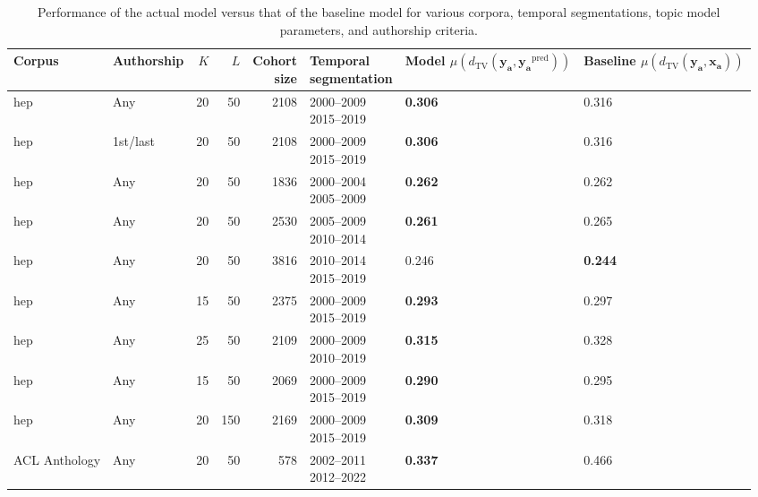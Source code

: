 \begin{table}[H]
\caption{Performance of the actual model versus that of the baseline model for various corpora, temporal segmentations, topic model parameters, and authorship criteria.}
\label{table:performance}
\begin{tabular}{llrrrlll}
\toprule
Corpus & Authorship & $K$ & $L$ & \makecell{Cohort \\ size} & \makecell{Temporal \\ segmentation} & \makecell{Model \\ $\mu(d_{{\mathrm{{TV}}}}(\bm{{y_{{a}}}}, \bm{{y_{{a}}}}^{{\text{{pred}}}}))$} & \makecell{Baseline \\ $\mu(d_{{\mathrm{{TV}}}}(\bm{{y_{{a}}}}, \bm{{x_{{a}}}}))$} \\
\midrule
\gls{hep} & Any & 20 & 50 & 2108 & \makecell{2000--2009 \\ 2015--2019} & \textbf{0.306} & 0.316 \\
\gls{hep} & 1st/last & 20 & 50 & 2108 & \makecell{2000--2009 \\ 2015--2019} & \textbf{0.306} & 0.316 \\
\gls{hep} & Any & 20 & 50 & 1836 & \makecell{2000--2004 \\ 2005--2009} & \textbf{0.262} & 0.262 \\
\gls{hep} & Any & 20 & 50 & 2530 & \makecell{2005--2009 \\ 2010--2014} & \textbf{0.261} & 0.265 \\
\gls{hep} & Any & 20 & 50 & 3816 & \makecell{2010--2014 \\ 2015--2019} & 0.246 & \textbf{0.244} \\
\gls{hep} & Any & 15 & 50 & 2375 & \makecell{2000--2009 \\ 2015--2019} & \textbf{0.293} & 0.297 \\
\gls{hep} & Any & 25 & 50 & 2109 & \makecell{2000--2009 \\ 2010--2019} & \textbf{0.315} & 0.328 \\
\gls{hep} & Any & 15 & 50 & 2069 & \makecell{2000--2009 \\ 2015--2019} & \textbf{0.290} & 0.295 \\
\gls{hep} & Any & 20 & 150 & 2169 & \makecell{2000--2009 \\ 2015--2019} & \textbf{0.309} & 0.318 \\
ACL Anthology & Any & 20 & 50 & 578 & \makecell{2002--2011 \\ 2012--2022} & \textbf{0.337} & 0.466 \\
\bottomrule
\end{tabular}
\end{table}

